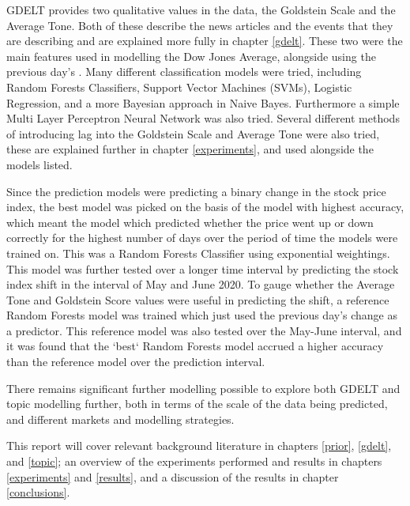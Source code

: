 GDELT provides two qualitative values in the data, the Goldstein Scale and the Average Tone. Both of these describe the news articles and the events that they are describing and are explained more fully in chapter \ref{gdelt}. These two were the main features used in modelling the Dow Jones Average, alongside using the previous day's . Many different classification models were tried, including Random Forests Classifiers, Support Vector Machines (SVMs), Logistic Regression, and a more Bayesian approach in Naive Bayes. Furthermore a simple Multi Layer Perceptron Neural Network was also tried. Several different methods of introducing lag into the Goldstein Scale and Average Tone were also tried, these are explained further in chapter \ref{experiments}, and used alongside the models listed. 

Since the prediction models were predicting a binary change in the stock price index, the best model was picked on the basis of the model with highest accuracy, which meant the model which predicted whether the price went up or down correctly for the highest number of days over the period of time the models were trained on. This was a Random Forests Classifier using exponential weightings. This model was further tested over a longer time interval by predicting the stock index shift in the interval of May and June 2020. To gauge whether the Average Tone and Goldstein Score values were useful in predicting the shift, a reference Random Forests model was trained which just used the previous day's change as a predictor. This reference model was also tested over the May-June interval, and it was found that the `best` Random Forests model accrued a higher accuracy than the reference model over the prediction interval.

There remains significant further modelling possible to explore both GDELT and topic modelling further, both in terms of the scale of the data being predicted, and different markets and modelling strategies. 

This report will cover relevant background literature in chapters \ref{prior}, \ref{gdelt}, and \ref{topic};  an overview of the experiments performed and results in chapters \ref{experiments} and \ref{results}, and a discussion of the results in chapter \ref{conclusions}.
